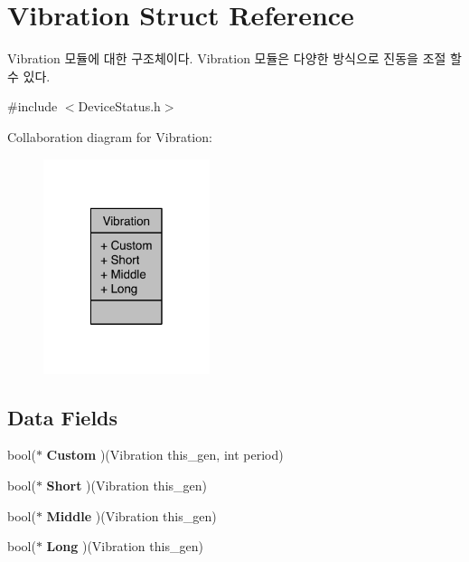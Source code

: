 \section{Vibration Struct Reference}
\label{struct__Vibration}


Vibration 모듈에 대한 구조체이다. Vibration 모듈은 다양한 방식으로 진동을 조절 할 수 있다.  




{\ttfamily \#include $<$Device\-Status.\-h$>$}



Collaboration diagram for Vibration\-:\nopagebreak
\begin{figure}[H]
\begin{center}
\leavevmode
\includegraphics[width=138pt]{struct__Vibration__coll__graph}
\end{center}
\end{figure}
\subsection*{Data Fields}
\begin{DoxyCompactItemize}
\item 
bool($\ast$ {\bfseries Custom} )(Vibration this\-\_\-gen, int period)\label{struct__Vibration_a631bb3f9274e221476eb4337271a8d63}

\item 
bool($\ast$ {\bfseries Short} )(Vibration this\-\_\-gen)\label{struct__Vibration_a2cc2339cd33a0093cfe693ed008c1e15}

\item 
bool($\ast$ {\bfseries Middle} )(Vibration this\-\_\-gen)\label{struct__Vibration_ad022e40158f1d61588985566258773ce}

\item 
bool($\ast$ {\bfseries Long} )(Vibration this\-\_\-gen)\label{struct__Vibration_ac3618369b49659c31a6c1bf8dfb24a2c}

\end{DoxyCompactItemize}


